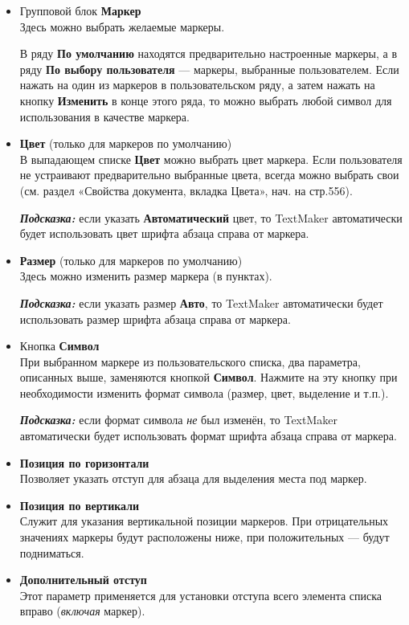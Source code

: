 \documentclass[a4paper,10pt]{article}
\begin{document}
\begin{itemize}
 \item Групповой блок \textbf{Маркер}\\
 Здесь можно выбрать желаемые маркеры.
 
 В ряду \textbf{По умолчанию} находятся предварительно настроенные маркеры, а в ряду \textbf{По выбору пользователя} --- маркеры, выбранные пользователем. Если нажать на один из маркеров в пользовательском ряду, а затем нажать на кнопку \textbf{Изменить} в конце этого ряда, то можно выбрать любой символ для использования в качестве маркера.
 \item \textbf{Цвет} (только для маркеров по умолчанию)\\
 В выпадающем списке \textbf{Цвет} можно выбрать цвет маркера. Если пользователя не устраивают предварительно выбранные цвета, всегда можно выбрать свои (см. раздел «Свойства документа, вкладка Цвета», нач. на стр.556).
 
 \textit{\textbf{Подсказка:}} если указать \textbf{Автоматический} цвет, то TextMaker автоматически будет использовать цвет шрифта абзаца справа от маркера.
 \item \textbf{Размер} (только для маркеров по умолчанию)\\
 Здесь можно изменить размер маркера (в пунктах).
 
 \textbf{\textit{Подсказка:}} если указать размер \textbf{Авто}, то TextMaker автоматически будет использовать размер шрифта абзаца справа от маркера.
 
 \item Кнопка \textbf{Символ}\\
 При выбранном маркере из пользовательского списка, два параметра, описанных выше, заменяются кнопкой \textbf{Символ}. Нажмите на эту кнопку при необходимости изменить формат символа (размер, цвет, выделение и т.п.).
 
 \textbf{\textit{Подсказка:}} если формат символа \textit{не} был изменён, то TextMaker автоматически будет использовать формат шрифта абзаца справа от маркера. 
 \item \textbf{Позиция по горизонтали}\\
 Позволяет указать отступ для абзаца для выделения места под маркер.
 \item \textbf{Позиция по вертикали}\\
 Служит для указания вертикальной позиции маркеров. При отрицательных значениях маркеры будут расположены ниже, при положительных — будут подниматься.
 \item \textbf{Дополнительный отступ}\\
 Этот параметр применяется для установки отступа всего элемента списка вправо (\textit{включая} маркер).
\end{itemize}
\end{document}
